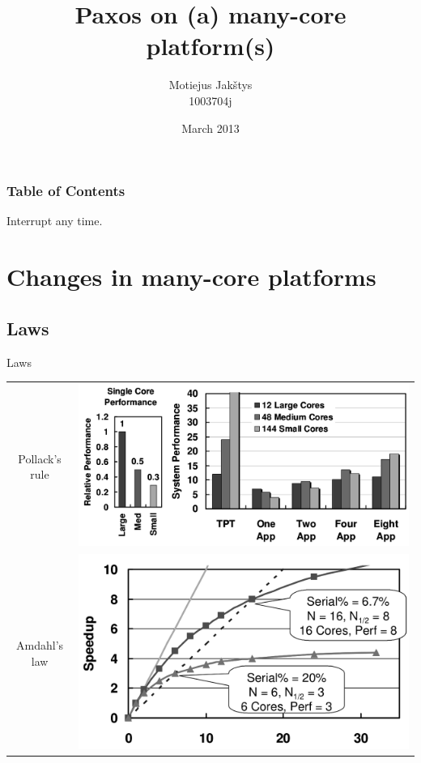 \documentclass[14pt]{beamer}
\title{Paxos on (a) many-core platform(s)}
\author{Motiejus Jak\v{s}tys \\
1003704j}
\date{March 2013}
\begin{document}
\begin{frame}[plain]
    \titlepage
\end{frame}

\begin{frame}
    \frametitle{Table of Contents}
    \tableofcontents[currentsection]
    Interrupt any time.
\end{frame}

\section{Changes in many-core platforms}

\subsection{Laws}

\begin{frame}{Laws}
    \begin{tabular}{cm{0cm}}
            Pollack's rule &
            \pause
            \includegraphics[height=0.4\textheight]{images/pollack.png}
            \\
            Amdahl's law &
            \pause
            \includegraphics[height=0.4\textheight]{images/amdahl.png} \\
    \end{tabular}
\end{frame}
\end{document}
